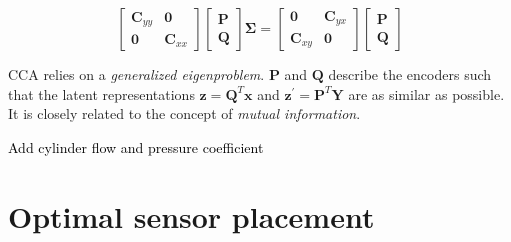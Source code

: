 \documentclass[aspectratio=169, usenames, dvipsnames]{beamer}
\begin{document}
\begin{frame}

  \vfill

    \begin{tcolorbox}[
      enhanced,
      coltitle=black,
      coltext=white,
      colback=black,
      title=\textbf{Canonical Correlation Analysis},
      frame style tile={width=\paperwidth}{background.jpg}
      ]

      \medskip

      \Large

      \[
      \begin{bmatrix}
        \bm{C}_{yy} & \bm{0} \\
        \bm{0} & \bm{C}_{xx}
      \end{bmatrix}
      \begin{bmatrix}
        \bm{P} \\ \bm{Q}
      \end{bmatrix}
      \boldsymbol{\Sigma}
      =
      \begin{bmatrix}
        \bm{0} & \bm{C}_{yx} \\
        \bm{C}_{xy} & \bm{0}
      \end{bmatrix}
      \begin{bmatrix}
        \bm{P} \\ \bm{Q}
      \end{bmatrix}
      \]

      \medskip
    \end{tcolorbox}

    \vfill

    CCA relies on a \emph{generalized eigenproblem}.
    $\bm{P}$ and $\bm{Q}$ describe the encoders such that the latent representations $\bm{z} = \bm{Q}^T \bm{x}$ and $\bm{z}^{\prime} = \bm{P}^T \bm{Y}$ are as similar as possible.
    It is closely related to the concept of \emph{mutual information}.

    \vfill
\end{frame}

{

\begin{frame}
  \textcolor{black}{Add cylinder flow and pressure coefficient}
\end{frame}

}

\section{Optimal sensor placement}
\begin{frame}
  \sectionpage
\end{frame}
\end{document}
